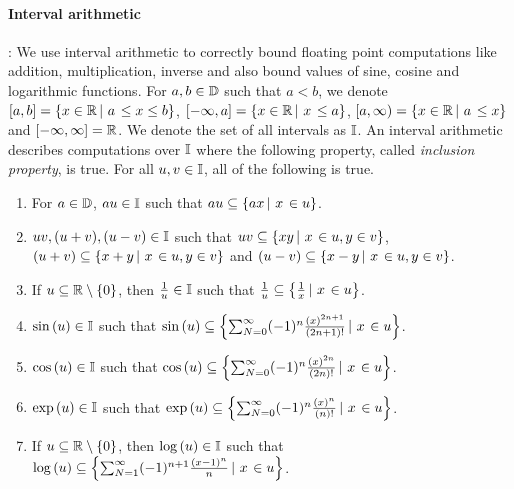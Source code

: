\paragraph{Interval arithmetic}:  We use interval arithmetic to
correctly bound floating point computations like addition,
multiplication, inverse and also bound values of sine, cosine and
logarithmic functions. For $a,b\in\mathbb{D}$ such that $a<b$, we
denote\\ $\left[a,b\right] = \left\{x\in\mathbb{R}\left|~a\right.\leq x\leq b\right\}$,
$[-\infty,a] = \left\{x\in\mathbb{R}\left|~x\right.\leq a\right\}$, $[a,\infty)
= \left\{x\in\mathbb{R}\left|~a\right.\leq x\right\}$ and $[-\infty,\infty] = \mathbb{R}$.  We
denote the set of all intervals as $\mathbb{I}$.  An interval
arithmetic describes computations over $\mathbb{I}$ where the
following property, called \emph{inclusion property}, is true.  For
all $u,v\in\mathbb{I}$, all of the following is true.
%
\begin{enumerate}
\item For $a\in\mathbb{D}$, $au\in\mathbb{I}$ such that $au\subseteq \left\{ax\left|~x\right.\in u\right\}$.
\item $uv,(u+v),(u-v)\in\mathbb{I}$ such that
$uv\subseteq\left\{xy\left|~x\right.\in u, y\in v\right\}$,\\ $\left(u+v\right)\subseteq\left\{x+y\left|~x\right.\in
u, y\in v\right\}$ and $\left(u-v\right)\subseteq\left\{x-y\left|~x\right.\in u, y\in v\right\}$.
\item If $u\subseteq\mathbb{R}\setminus\left\{0\right\}$, then $\frac{1}{u}\in\mathbb{I}$ such that $\frac{1}{u}\subseteq\left\{\frac{1}{x}\left|~x\right.\in u\right\}$.
\item $\sin\left(u\right)\in\mathbb{I}$ such that $\sin\left(u\right)\subseteq\left\{\sum_{N=0}^\infty(-1)^n\frac{\left(x\right)^{2n+1}}{\left(2n+1\right)!}\left|~x\right.\in u\right\}$.
\item $\cos\left(u\right)\in\mathbb{I}$ such that $\cos\left(u\right)\subseteq\left\{\sum_{N=0}^\infty (-1)^n\frac{\left(x\right)^{2n}}{\left(2n\right)!}\left|~x\right.\in u\right\}$.
\item $\exp\left(u\right)\in\mathbb{I}$ such that $\exp\left(u\right)\subseteq\left\{\sum_{N=0}^\infty(-1)^n\frac{\left(x\right)^{n}}{\left(n\right)!}\left|~x\right.\in u\right\}$.
\item If $u\subseteq\mathbb{R}\setminus\left\{0\right\}$, then $\log\left(u\right)\in\mathbb{I}$ such that\\ $\log\left(u\right)\subseteq\left\{\sum_{N=1}^\infty(-1)^{n+1}\frac{\left(x-1\right)^{n}}{n}\left|~x\right.\in u\right\}$.
\end{enumerate}
%

